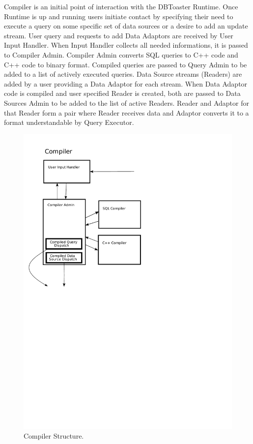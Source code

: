 \documentclass[14pt]{article}
\begin{document}

Compiler is an initial point of interaction with the DBToaster Runtime. Once Runtime is up and running users initiate contact by specifying their need to execute a query on some specific set of data sources or a desire to add an update stream. User query and requests to add Data Adaptors are received by User Input Handler. When Input Handler collects all needed informations, it is passed to Compiler Admin. Compiler Admin converts  SQL queries to C++ code and C++ code to binary format. Compiled queries are passed to Query Admin to be added to a list of actively executed queries. Data Source streams (Readers) are added by a user providing a Data Adaptor for each stream. When Data Adaptor code is compiled and user specified Reader is created, both are passed to Data Sources Admin to be added to the list of active Readers. Reader and Adaptor for that Reader form a pair where Reader receives data and Adaptor converts it to a format understandable by Query Executor.


\begin{figure}
  \includegraphics[width=4.50in]{../figures/compiler.pdf}
  \caption{Compiler Structure.}
  \label{CompilerPicture}
\end{figure}
\end{document}
